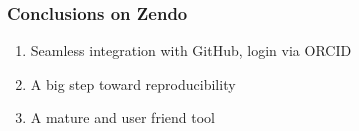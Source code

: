 
\begin{frame}[c]
\frametitle{Conclusions on Zendo}

\begin{enumerate}
\item Seamless integration with GitHub, login via ORCID
\item A big step toward reproducibility
\item A mature and user friend tool 
\end{enumerate}

\end{frame}




